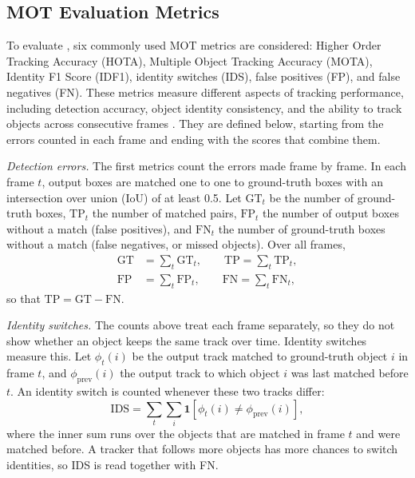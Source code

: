 

\subsection{MOT Evaluation Metrics}\label{sec:metrics}
To evaluate \scl{}, six commonly used MOT metrics are considered: Higher Order Tracking Accuracy
(HOTA), Multiple Object Tracking Accuracy (MOTA), Identity F1 Score (IDF1), identity switches
(IDS), false positives (FP), and false negatives (FN). These metrics measure different aspects of
tracking performance, including detection accuracy, object identity consistency, and the ability to
track objects across consecutive frames \cite{dendorfer2021motchallenge,luiten2021hota}. They are
defined below, starting from the errors counted in each frame and ending with the scores that
combine them.

\emph{Detection errors.} The first metrics count the errors made frame by frame. In each frame
$t$, output boxes are matched one to one to ground-truth boxes with an intersection over union
(IoU) of at least 0.5. Let $\mathrm{GT}_t$ be the number of ground-truth boxes, $\mathrm{TP}_t$ the
number of matched pairs, $\mathrm{FP}_t$ the number of output boxes without a match (false
positives), and $\mathrm{FN}_t$ the number of ground-truth boxes without a match (false negatives,
or missed objects). Over all frames,
\begin{align}
\mathrm{GT}&=\sum_t \mathrm{GT}_t,\qquad \mathrm{TP}=\sum_t \mathrm{TP}_t,\label{eq:gt}\\
\mathrm{FP}&=\sum_t \mathrm{FP}_t,\qquad \mathrm{FN}=\sum_t \mathrm{FN}_t,\label{eq:fpfn}
\end{align}
so that $\mathrm{TP}=\mathrm{GT}-\mathrm{FN}$.

\emph{Identity switches.} The counts above treat each frame separately, so they do not show
whether an object keeps the same track over time. Identity switches measure this. Let
$\phi_t(i)$ be the output track matched to ground-truth object $i$ in frame $t$, and
$\phi_{\mathrm{prev}}(i)$ the output track to which object $i$ was last matched before $t$. An
identity switch is counted whenever these two tracks differ:
\begin{equation}
\mathrm{IDS}=\sum_t\sum_{i}\mathbf{1}\!\left[\phi_t(i)\neq\phi_{\mathrm{prev}}(i)\right],
\label{eq:ids}
\end{equation}
where the inner sum runs over the objects that are matched in frame $t$ and were matched before.
A tracker that follows more objects has more chances to switch identities, so IDS is read together
with FN.

